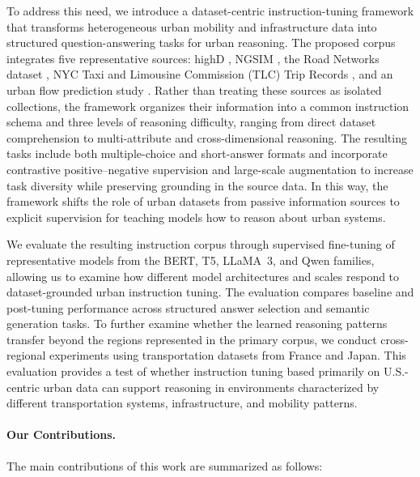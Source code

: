 \documentclass[a4paper,fleqn]{cas-sc}
\begin{document}
To address this need, we introduce a dataset-centric instruction-tuning framework that transforms heterogeneous urban mobility and infrastructure data into structured question-answering tasks for urban reasoning. The proposed corpus integrates five representative sources: highD \cite{highd2024dataset}, NGSIM \cite{ngsim2024dataset}, the Road Networks dataset \cite{networkrepository2024road}, NYC Taxi and Limousine Commission (TLC) Trip Records \cite{nyc2024tlc}, and an urban flow prediction study \cite{wang2019optimal}. Rather than treating these sources as isolated collections, the framework organizes their information into a common instruction schema and three levels of reasoning difficulty, ranging from direct dataset comprehension to multi-attribute and cross-dimensional reasoning. The resulting tasks include both multiple-choice and short-answer formats and incorporate contrastive positive--negative supervision and large-scale augmentation to increase task diversity while preserving grounding in the source data. In this way, the framework shifts the role of urban datasets from passive information sources to explicit supervision for teaching models how to reason about urban systems.

We evaluate the resulting instruction corpus through supervised fine-tuning of representative models from the BERT, T5, LLaMA~3, and Qwen families, allowing us to examine how different model architectures and scales respond to dataset-grounded urban instruction tuning. The evaluation compares baseline and post-tuning performance across structured answer selection and semantic generation tasks. To further examine whether the learned reasoning patterns transfer beyond the regions represented in the primary corpus, we conduct cross-regional experiments using transportation datasets from France and Japan. This evaluation provides a test of whether instruction tuning based primarily on U.S.-centric urban data can support reasoning in environments characterized by different transportation systems, infrastructure, and mobility patterns.

\paragraph{Our Contributions.}
The main contributions of this work are summarized as follows:
\end{document}
